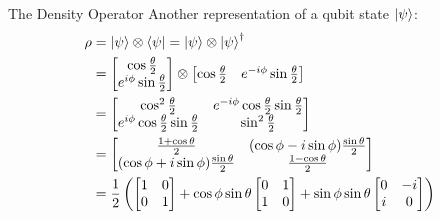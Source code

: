 \documentclass{beamer}
\begin{document}
\begin{frame}{The Density Operator\tiny\cite{rotationsonblochsphere}}
  {\tiny
  Another representation of a qubit state $\ket{\psi}$:
    \begin{align*}
      \rho &= \ket{\psi} \otimes \bra{\psi} = \ket{\psi} \otimes \ket{\psi}^{\dagger} \\
           &= \begin{bmatrix}
                \cos{\frac{\theta}2} \\
                e^{i\phi}\sin{\frac{\theta}2}
              \end{bmatrix}
              \otimes
              \begin{bmatrix}
                \cos{\frac{\theta}2} & e^{-i\phi}\sin{\frac{\theta}2}
              \end{bmatrix} \\
           &= \begin{bmatrix}
                \cos^2{\frac{\theta}2}                            & e^{-i\phi}\cos{\frac{\theta}2}\sin{\frac{\theta}2} \\
                e^{i\phi}\cos{\frac{\theta}2}\sin{\frac{\theta}2} & \sin^2{\frac{\theta}2}
              \end{bmatrix} \\
           &= \begin{bmatrix}
                \frac{1+\cos{\theta}}2                       & (\cos{\phi}-i\sin{\phi})\frac{\sin\theta}2 \\
                (\cos{\phi}+i\sin{\phi})\frac{\sin\theta}2   & \frac{1-\cos{\theta}}2
              \end{bmatrix} \\
           &= \frac{1}2
              \begin{pmatrix}
                \begin{bmatrix}
                  1 & 0 \\
                  0 & 1
                \end{bmatrix}
                +
                \cos\phi\sin\theta
                \begin{bmatrix}
                  0 & 1 \\
                  1 & 0
                \end{bmatrix}
                +
                \sin\phi\sin\theta
                \begin{bmatrix}
                  0 & -i \\
                  i & 0
                \end{bmatrix}

\end{pmatrix}
\end{align*}}
\end{frame}
\end{document}
